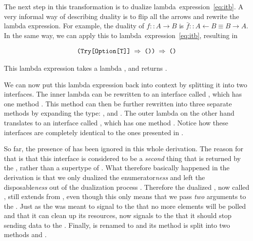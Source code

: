 The next step in this transformation is to dualize \cite{rydeheard1988-Category-Theory} lambda~expression~\ref{eq:itb}. A very informal way of describing duality is to flip all the arrows and rewrite the lambda expression. For example, the duality of $f :: A \rightarrow B$ is $\bar{f} :: A \leftarrow B \equiv B \rightarrow A$. In the same way, we can apply this to lambda~expression~\ref{eq:itb}, resulting in

\begin{equation} \label{eq:obs}
\code{(Try[Option[T]] $\Rightarrow$ ()) $\Rightarrow$ ()}
\end{equation}

This lambda expression takes a lambda , and returns .

We can now put this lambda expression back into context by splitting it into two interfaces. The inner lambda  can be rewritten to an interface called \obv, which has one method . This method can then be further rewritten into three separate methods by expanding the  type: ,  and . The outer lambda on the other hand translates to an interface called \obs, which has one method . Notice how these interfaces are completely identical to the ones presented in .


So far, the presence of \id has been ignored in this whole derivation. The reason for that is that this interface is considered to be a \emph{second} thing that is returned by the \ieb, rather than a supertype of \ier. What therefore basically happened in the derivation is that we only dualized the enumerator\textit{ness} and left the disposable\textit{ness} out of the dualization process \cite{E2E-Rx}. Therefore the dualized \ier, now called \obv, still extends from \id, even though this only means that we pass \textit{two} arguments to the . Just as the \id was meant to signal to the \ieb that no more elements will be polled and that it can clean up its resources, now \id signals to the \obs that it should stop sending data to the \obv. Finally, \id is renamed to \subs and its method  is split into two methods  and .


